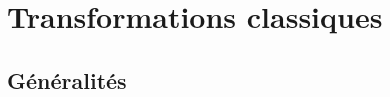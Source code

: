 \documentclass[12pt]{article}
\theoremstyle{cstyle}{\newtheorem{definition}{Définition}[section]}
\theoremstyle{cstyle}{\newtheorem{proposition}[definition]{Propriété}}
\theoremstyle{cstyle}{\newtheorem{theorem}[definition]{Théorème}}
\theoremstyle{mystyle}{\newtheorem{lemma}[definition]{Lemme}}
\theoremstyle{mystyle}{\newtheorem{corollary}[definition]{Corollaire}}
\theoremstyle{mystyle}{\newtheorem*{remark}{Remarque}}
\theoremstyle{mystyle}{\newtheorem*{remarks}{Remarques}}
\theoremstyle{mystyle}{\newtheorem*{example}{Exemple}}
\theoremstyle{mystyle}{\newtheorem*{examples}{Exemples}}
\theoremstyle{definition}{\newtheorem*{exercise}{Exercice}}
\theoremstyle{mystyle}{\newtheorem*{methode}{Méthode}}
\theoremstyle{cstyle}{\newtheorem*{cthm}{}}
\theoremstyle{warn}
\begin{document}
	\newpage
	\begin{minipage}[t]{0.45\textwidth}
		\section{Transformations classiques}
		\subsection{Généralités}
		
		\begin{definition}
			
		\end{definition}
	\end{minipage}
	\hfill
	\vrule
	\hfill
	\begin{minipage}[t]{0.45\textwidth}
	\end{minipage}

	\newpage
	\begin{minipage}[t]{0.45\textwidth}
	\end{minipage}
	\hfill
	\vrule
	\hfill
	\begin{minipage}[t]{0.45\textwidth}
	\end{minipage}
	
	
\end{document}
